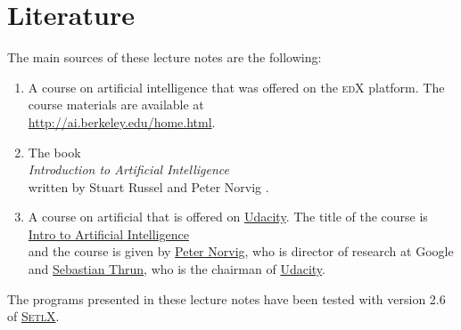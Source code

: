 \section{Literature}
The main sources of these lecture notes are the following:
\begin{enumerate}
\item A course on artificial intelligence that was offered on the \textsc{edX} platform.  The course
      materials are available at  
      \\[0.2cm]
      \hspace*{1.3cm}
      \href{http://ai.berkeley.edu/home.html}{http://ai.berkeley.edu/home.html}.
\item The book
      \\[0.2cm]
      \hspace*{1.3cm}
      \emph{Introduction to Artificial Intelligence}
      \\[0.2cm]
      written by Stuart Russel and Peter Norvig \cite{russell:2009}.
\item A course on artificial that is offered on \href{https://www.udacity.com}{Udacity}.  The title of the
      course is
      \\[0.2cm]
      \hspace*{1.3cm}
      \href{https://www.udacity.com/course/intro-to-artificial-intelligence--cs271}{Intro to Artificial Intelligence}
      \\[0.2cm]
      and the course is given by \href{https://en.wikipedia.org/wiki/Peter_Norvig}{Peter Norvig}, who is
      director of research at Google and \href{https://en.wikipedia.org/wiki/Sebastian_Thrun}{Sebastian Thrun},
      who is the chairman of \href{https://www.udacity.com}{Udacity}.
\end{enumerate}
The programs presented in these lecture notes have been tested with version 2.6 of 
\href{https://randoom.org/Software/SetlX}{\textsc{SetlX}}.


